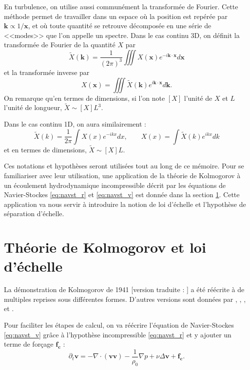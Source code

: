 En turbulence, on utilise aussi communément la transformée de Fourier. Cette méthode permet de travailler dans un espace où la position est repérée par $\boldsymbol{k} \propto 1/\mathbf{x}$, et où toute quantité se retrouve décomposée en une série de <<modes>> que l'on appelle un spectre. Dans le cas continu 3D, on définit la transformée de Fourier de la quantité $X$ par 
\begin{equation}
    \tilde{X}(\boldsymbol{k}) = \frac{1}{(2\pi)^3} \iiint X(\mathbf{x}) e^{-i\boldsymbol{k} \cdot \mathbf{x}} d\mathbf{x}
\end{equation}
et la transformée inverse par 
\begin{equation}
    X(\mathbf{x}) = \iiint \tilde{X}(\boldsymbol{k}) e^{i\boldsymbol{k} \cdot \mathbf{x}} d\boldsymbol{k}.
\end{equation} 
On remarque qu'en termes de dimensions, si l'on note $[X]$ l'unité de $X$ et $L$ l'unité de longueur, $\tilde{X} \sim [X] L^3$.

Dans le cas continu 1D, on aura similairement : 
\begin{equation}
    \tilde{X}(k) = \frac{1}{2\pi} \int X(x) e^{-ikx} dx , \qquad 
    X(x) = \int \tilde{X}(k) e^{ikx} dk
\end{equation} 
et en termes de dimensions, $\tilde{X} \sim [X] L$.

Ces notations et hypothèses seront utilisées tout au long de ce mémoire. Pour se familiariser avec leur utilisation, une application de la théorie de Kolmogorov à un écoulement hydrodynamique incompressible décrit par les équations de Navier-Stockes \eqref{eq:navst_r} et \eqref{eq:navst_v} est donnée dans la section \ref{sec-013}. Cette application va nous servir à introduire la notion de loi d'échelle et l'hypothèse de séparation d'échelle.


\section{Théorie de Kolmogorov et loi d'échelle}\label{sec-013}

La démonstration de Kolmogorov de 1941 [version traduite :  \cite{kolmogorov_local_1991,kolmogorov_dissipation_1991}] a été réécrite à de multiples reprises sous différentes formes. D'autres versions sont données par \cite{monin_statistical_1975}, \cite{frisch_turbulence_1995}, \cite{antonia_analogy_1997}, et \cite{galtier_physique_2021}. 

Pour faciliter les étapes de calcul, on va réécrire l'équation de Navier-Stockes \eqref{eq:navst_v} grâce à l'hypothèse incompressible \eqref{eq:navst_r} et y ajouter un terme de forçage $\boldsymbol{f_c}$ : 
\begin{equation}
  \label{eq:navst_v2}  \partial_t \boldsymbol{v} = - \nabla \cdot (\boldsymbol{v} \boldsymbol{v}) -  \frac{1}{\rho_0} \nabla p + \nu \Delta \boldsymbol{v} + \boldsymbol{f_c} 
.\end{equation}

